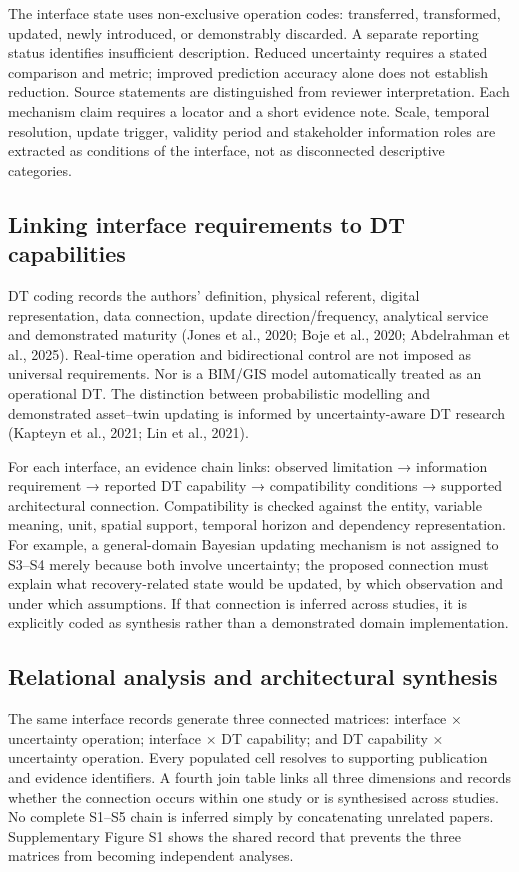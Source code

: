 The interface state uses non-exclusive operation codes: transferred, transformed, updated, newly introduced, or demonstrably discarded. A separate reporting status identifies insufficient description. Reduced uncertainty requires a stated comparison and metric; improved prediction accuracy alone does not establish reduction. Source statements are distinguished from reviewer interpretation. Each mechanism claim requires a locator and a short evidence note. Scale, temporal resolution, update trigger, validity period and stakeholder information roles are extracted as conditions of the interface, not as disconnected descriptive categories.


\subsection{Linking interface requirements to DT capabilities}
DT coding records the authors' definition, physical referent, digital representation, data connection, update direction/frequency, analytical service and demonstrated maturity (Jones et al., 2020; Boje et al., 2020; Abdelrahman et al., 2025). Real-time operation and bidirectional control are not imposed as universal requirements. Nor is a BIM/GIS model automatically treated as an operational DT. The distinction between probabilistic modelling and demonstrated asset–twin updating is informed by uncertainty-aware DT research (Kapteyn et al., 2021; Lin et al., 2021).

For each interface, an evidence chain links: observed limitation → information requirement → reported DT capability → compatibility conditions → supported architectural connection. Compatibility is checked against the entity, variable meaning, unit, spatial support, temporal horizon and dependency representation. For example, a general-domain Bayesian updating mechanism is not assigned to S3–S4 merely because both involve uncertainty; the proposed connection must explain what recovery-related state would be updated, by which observation and under which assumptions. If that connection is inferred across studies, it is explicitly coded as synthesis rather than a demonstrated domain implementation.


\subsection{Relational analysis and architectural synthesis}
The same interface records generate three connected matrices: interface × uncertainty operation; interface × DT capability; and DT capability × uncertainty operation. Every populated cell resolves to supporting publication and evidence identifiers. A fourth join table links all three dimensions and records whether the connection occurs within one study or is synthesised across studies. No complete S1–S5 chain is inferred simply by concatenating unrelated papers. Supplementary Figure S1 shows the shared record that prevents the three matrices from becoming independent analyses.

